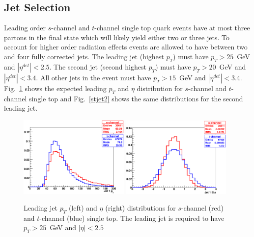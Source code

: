 \subsection{Jet Selection}
\label{jetselection}

Leading order $s$-channel and $t$-channel single top quark events have at most three partons in the final state which will likely yield either two or three jets. To account for higher order radiation effects events are allowed to have between two and four fully corrected jets. The leading jet (highest $p_{T}$) must have $p_{T}>25$~GeV and $|\eta^{det}|<2.5$. The second jet (second highest $p_{T}$) must have $p_{T}>20$~GeV and $|\eta^{det}|<3.4$. All other jets in the event must have $p_{T}>15$~GeV and $|\eta^{det}|<3.4$. Fig.~\ref{stjet1} shows the expected leading $p_{T}$ and $\eta$ distribution for $s$-channel and $t$-channel single top and Fig.~\ref{stjet2} shows the same distributions for the second leading jet.

\begin{figure}[!h!tbp]
\begin{center}
\includegraphics[width=0.48\textwidth]{eps/Analysis/Jet1Pt.eps}
\includegraphics[width=0.48\textwidth]{eps/Analysis/Jet1Eta.eps}
\end{center}
\vspace{-0.1in}
\caption{Leading jet $p_{T}$ (left) and $\eta$ (right) distributions for $s$-channel (red) and $t$-channel (blue) single top. The leading jet is required to have $p_{T}>25$~GeV and $|\eta|<2.5$}
\label{stjet1}
\end{figure}

